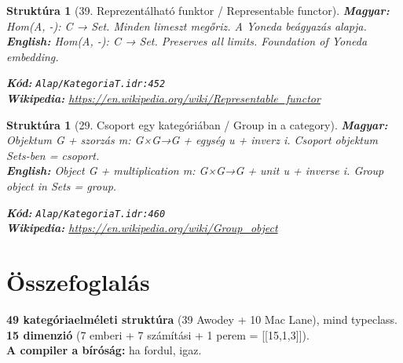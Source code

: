 \documentclass[11pt,a4paper,twocolumn]{article}
\newtheorem{struktura}[tetel]{Struktúra}
\begin{document}
\begin{struktura}[39. Reprezentálható funktor / Representable functor]

\textbf{Magyar:} Hom(A, -): C → Set. Minden limeszt megőriz. A Yoneda beágyazás alapja.\\

\textbf{English:} Hom(A, -): C → Set. Preserves all limits. Foundation of Yoneda embedding.\\

\begin{center}
\end{center}

\textbf{Kód:} \texttt{Alap/KategoriaT.idr:452}\\
\textbf{Wikipedia:} \url{https://en.wikipedia.org/wiki/Representable_functor}

\end{struktura}

\vspace{0.5cm}

\begin{struktura}[29. Csoport egy kategóriában / Group in a category]

\textbf{Magyar:} Objektum G + szorzás m: G×G→G + egység u + inverz i. Csoport objektum Sets-ben = csoport.\\

\textbf{English:} Object G + multiplication m: G×G→G + unit u + inverse i. Group object in Sets = group.\\

\begin{center}
\end{center}

\textbf{Kód:} \texttt{Alap/KategoriaT.idr:460}\\
\textbf{Wikipedia:} \url{https://en.wikipedia.org/wiki/Group_object}

\end{struktura}

\vspace{0.5cm}

\section{Összefoglalás}

\textbf{49 kategóriaelméleti struktúra} (39 Awodey + 10 Mac Lane), mind typeclass.\\
\textbf{15 dimenzió} (7 emberi + 7 számítási + 1 perem = [[15,1,3]]).\\
\textbf{A compiler a bíróság:} ha fordul, igaz.
\end{document}
